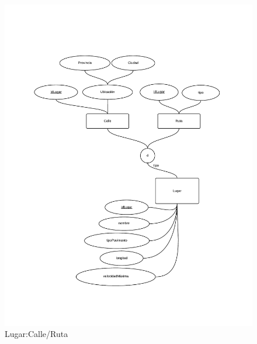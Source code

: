 \begin{figure}
  \begin{center}
    \includegraphics[scale=0.6]{diagramas/2-3.pdf}
    \caption{Lugar:Calle/Ruta}
  \end{center}
\end{figure}






